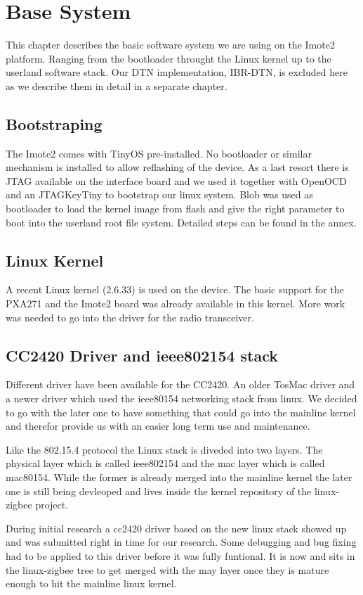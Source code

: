 \chapter{Base System}
This chapter describes the basic software system we are using on the Imote2
platform. Ranging from the bootloader throught the Linux kernel up to the
userland software stack. Our DTN implementation, IBR-DTN, is excluded here as we
describe them in detail in a separate chapter.

\section{Bootstraping}
The Imote2 comes with TinyOS pre-installed. No bootloader or similar mechanism
is installed to allow reflashing of the device. As a last resort there is JTAG
available on the interface board and we used it together with OpenOCD and an
JTAGKeyTiny to bootstrap our linux system. Blob was used as bootloader to load
the kernel image from flash and give the right parameter to boot into the
userland root file system. Detailed steps can be found in the annex.

\section{Linux Kernel}
A recent Linux kernel (2.6.33) is used on the device. The basic support for the
PXA271 and the Imote2 board was already available in this kernel. More work was
needed to go into the driver for the radio transceiver.

\section{CC2420 Driver and ieee802154 stack}
Different driver have been available for the CC2420. An older TosMac driver and
a newer driver which used the ieee80154 networking stack from linux. We decided
to go with the later one to have something that could go into the mainline
kernel and therefor provide us with an easier long term use and maintenance.

Like the 802.15.4 protocol the Linux stack is diveded into two layers. The
physical layer which is called ieee802154 and the mac layer which is called
mac80154. While the former is already merged into the mainline kernel the later
one is still being devleoped and lives inside the kernel repository of the
linux-zigbee project.

During initial research a cc2420 driver based on the new linux stack showed up
and was submitted right in time for our research. Some debugging and bug fixing
had to be applied to this driver before it was fully funtional. It is now and
sits in the linux-zigbee tree to get merged with the may layer once they is
mature enough to hit the mainline linux kernel.


